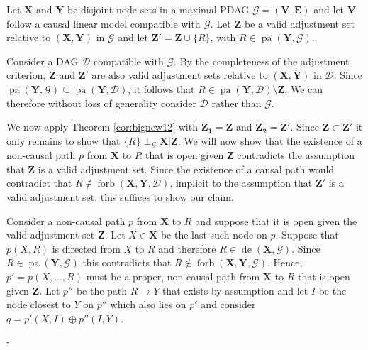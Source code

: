 \documentclass[11pt,a4paper]{article}
\theoremstyle{definition}
\theoremstyle{remark}
\newenvironment{proofof}[1][]{\begin{trivlist}
\item[\hskip \labelsep {\textit{Proof of #1.}}]}{\hfill{}$\square$\end{trivlist}}
\DeclareMathOperator{\Forbb}{forb}
\DeclareMathOperator{\pa}{pa}
\DeclareMathOperator{\de}{de}
\newcommand{\mpdag}{maximal PDAG}
\newcommand{\g}[1][G]{\mathcal{#1}}
\newcommand{\fb}[2][X,Y]{\Forbb(\mathbf{#1},#2)}
\begin{document}
\begin{proofof}[Corollary \ref{cor:goodparents}]
	Let $\mathbf{X}$ and $\mathbf{Y}$ be disjoint node sets in a \mpdag{} $\g = (\mathbf{V},\mathbf{E})$ and let $\mathbf{V}$ follow a causal linear model compatible with $\g$. Let $\mathbf{Z}$  be a valid adjustment set relative to $(\mathbf{X},\mathbf{Y})$ in $\g$ and let $\mathbf{Z'} = \mathbf{Z} \cup \{R\}$, with $R \in \pa(\mathbf{Y},\g)$. 
	
	Consider a DAG $\g[D]$ compatible with $\g$. By the completeness of the adjustment criterion, $\mathbf{Z}$ and $\mathbf{Z'}$ are also valid adjustment sets relative to $(\mathbf{X},\mathbf{Y})$ in $\g[D]$. Since $\pa(\mathbf{Y},\g) \subseteq \pa(\mathbf{Y},\g[D])$, it follows that $R \in \pa(\mathbf{Y},\g[D]) \setminus \mathbf{Z}$. We can therefore without loss of generality consider $\g[D]$ rather than $\g$.
	
	
	We now apply Theorem \ref{cor:bignew12} with $\mathbf{Z_1} = \mathbf{Z}$ and $\mathbf{Z_2} = \mathbf{Z'}$. Since $\mathbf{Z} \subset \mathbf{Z'}$ it only remains to show that $\{R\} \perp_{\g} \mathbf{X} | \mathbf{Z}$. We will now show that the existence of a non-causal path $p$ from $\mathbf{X}$ to $R$ that is open given $\mathbf{Z}$ contradicts the assumption that $\mathbf{Z}$ is a valid adjustment set. Since the existence of a causal path would contradict that $R \notin \fb{\g[D]}$, implicit to the assumption that $\mathbf{Z'}$ is a valid adjustment set, this suffices to show our claim.
	
	
	Consider a non-causal path $p$ from $\mathbf{X}$ to $R$ and suppose that it is open given the valid adjustment set $\mathbf{Z}$. Let $X \in \mathbf{X}$ be the last such node on $p$. Suppose that $p(X,R)$ is directed from $X$ to $R$ and therefore $R \in \de(\mathbf{X},\g)$. Since $R \in \pa(\mathbf{Y},\g)$ this contradicts that $R \notin \fb{\g}$. Hence, $p'=p(X, \dots, R)$ must be a proper, non-causal path from $\mathbf{X}$ to $R$ that is open given $\mathbf{Z}$. 
	Let $p''$ be the path $R \rightarrow Y$ that exists by assumption and let $I$ be the node closest to $Y$ on $p''$ which also lies on $p'$ and consider $q = p'(X,I) \oplus p''(I,Y)$.  
	

\end{proofof}
\end{document}
